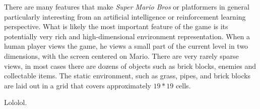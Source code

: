 \documentclass[12pt]{article}
\begin{document}
\begin{multicols*}{2}
There are many features that make \textit {Super Mario Bros} or platformers in general particularly interesting from an artificial intelligence or reinforcement learning perspective. What is likely the most important feature of the game is its potentially very rich and high-dimensional environment representation. When a human player views the game, he views a small part of the current level in two dimensions, with the screen centered on Mario. There are very rarely sparse views, in most cases there are dozens of objects such as brick blocks, enemies and collectable items. The static environment, such as grass, pipes, and brick blocks are laid out in a grid that covers approximately $19 * 19$ cells.

Lololol.

\end{multicols*}
\end{document}
